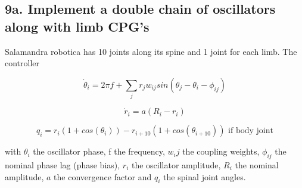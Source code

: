 \documentclass{cmc}
\begin{document}
\subsection*{9a. Implement a double chain of oscillators along with
  limb CPG's}
\label{sec:implement-chain}

Salamandra robotica has 10 joints along its spine and 1 joint for each
limb. The controller

\begin{equation}
  \label{eq:dphase}
  \dot{\theta}_i = 2 \pi f + \sum_j r_j w_{ij} sin(\theta_j - \theta_i - \phi_{ij})
\end{equation}

\begin{equation}
  \label{eq:dr}
  \dot{r}_i = a (R_i - r_i)
\end{equation}

\begin{equation}
  \label{eq:output}
  q_i = r_i(1 + cos(\theta_i)) - r_{i+10}(1 + cos(\theta_{i+10})) \text{ if body joint}
\end{equation}

with $ \theta_i $ the oscillator phase, f the frequency, $ w{_ij} $ the coupling
weights, $ \phi_{ij} $ the nominal phase lag (phase bias), $ r_i $ the
oscillator amplitude, $ R_i $ the nominal amplitude, $ a $ the convergence
factor and $ q_i $ the spinal joint angles.
\end{document}

